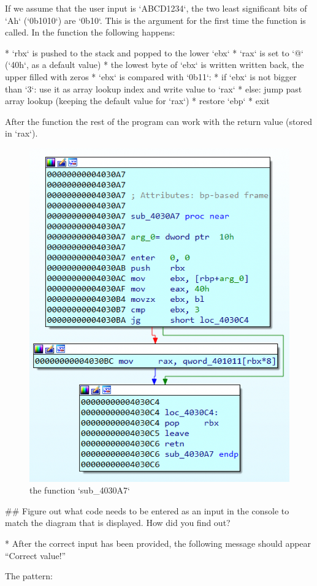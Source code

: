 \begin{markdown}
\noindent\s If we assume that the user input is `ABCD1234`, the two least significant bits of `Ah` (`0b1010`) are `0b10`. This is the argument for the first time the function is called.
\n
In the function the following happens:\s

* `rbx` is pushed to the stack and popped to the lower `ebx`
* `rax` is set to `@` (`40h`, as a default value)
* the lowest byte of `ebx` is written written back, the upper filled with zeros
* `ebx` is compared with `0b11`:
    * if `ebx` is not bigger than `3`: use it as array lookup index and write value to `rax`
    * else: jump past array lookup (keeping the default value for `rax`)
* restore `ebp`
* exit

\noindent\s After the function the rest of the program can work with the return value (stored in `rax`).

\begin{figure}[!htbp]
\centering
\includegraphics[width=0.8\linewidth]{media/a7.png}
\caption{the function `sub_4030A7`}\label{a7}
\end{figure}

## Figure out what code needs to be entered as an input in the console to match the diagram that is displayed. How did you find out?

* After the correct input has been provided, the following message should appear “Correct value!”

\noindent\s The pattern:

\end{markdown}
